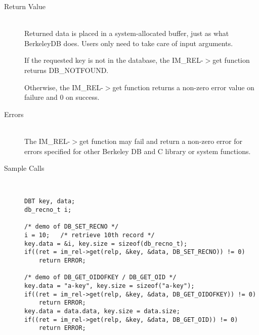 \documentclass[11pt]{article}
\def\cdf{\sf }
\def\cdf{\sf }
\newcommand{\IMREL}{{\small{\cdf IM\_REL}}}
\newcommand{\DBNOTFOUND}{{\small{\cdf DB\_NOTFOUND}}}
\begin{document}
\begin{description}
\item[Return Value]\ \\
  Returned data is placed in a system-allocated buffer, just as what
  BerkeleyDB does.  Users only need to take care of input arguments.

  If the requested key is not in the database, the {\IMREL}-$>$get
  function returns {\DBNOTFOUND}.

  Otherwise, the {\IMREL}-$>$get function returns a non-zero error
  value on failure and 0 on success. 

\item[Errors]\ \\
  The {\IMREL}-$>$get function may fail and return a non-zero error
  for errors specified for other Berkeley DB and C library or system
  functions.

\item[Sample Calls]\ 
\begin{verbatim}
DBT key, data;
db_recno_t i;

/* demo of DB_SET_RECNO */
i = 10;   /* retrieve 10th record */
key.data = &i, key.size = sizeof(db_recno_t);
if((ret = im_rel->get(relp, &key, &data, DB_SET_RECNO)) != 0)
    return ERROR;

/* demo of DB_GET_OIDOFKEY / DB_GET_OID */
key.data = "a-key", key.size = sizeof("a-key");
if((ret = im_rel->get(relp, &key, &data, DB_GET_OIDOFKEY)) != 0)
    return ERROR;
key.data = data.data, key.size = data.size;
if((ret = im_rel->get(relp, &key, &data, DB_GET_OID)) != 0)
    return ERROR;
\end{verbatim}
\end{description}

\newpage
\end{document}
